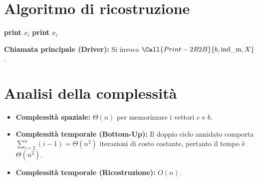 \section{Algoritmo di ricostruzione}
\begin{algorithm}[htbp]
\caption{Ricostruzione della sottosequenza senza 2 rossi o 2 blu consecutivi}
\begin{algorithmic}[1]
        \State \textbf{print} $x_i$
        \State \Return
    \Else
        \State {}
        \State \textbf{print} $x_i$
    \EndIf
\EndProcedure
\end{algorithmic}
\end{algorithm}

\noindent
\textbf{Chiamata principale (Driver):} Si invoca $\Call{Print-2R2B}{b, \text{ind\_m}, X}$.

\section{Analisi della complessità}
\begin{itemize}
    \item \textbf{Complessità spaziale:} $\Theta(n)$ per memorizzare i vettori $c$ e $b$.
    \item \textbf{Complessità temporale (Bottom-Up):} Il doppio ciclo annidato comporta $\sum_{i=2}^{n} (i-1) = \Theta(n^2)$ iterazioni di costo costante, pertanto il tempo è $\Theta(n^2)$.
    \item \textbf{Complessità temporale (Ricostruzione):} $O(n)$.
\end{itemize}